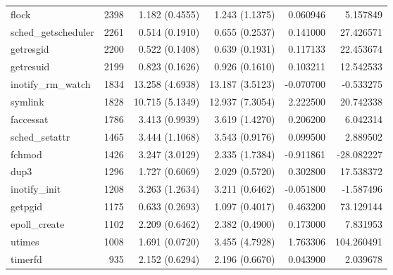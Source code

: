 \begin{longtable}{>{\ttfamily}lrrrrr}
                          flock &        2398 &           1.182 (0.4555) &           1.243 (1.1375) &        0.060946 &     5.157849 \\
            sched\_getscheduler &        2261 &           0.514 (0.1910) &           0.655 (0.2537) &        0.141000 &    27.426571 \\
                      getresgid &        2200 &           0.522 (0.1408) &           0.639 (0.1931) &        0.117133 &    22.453674 \\
                      getresuid &        2199 &           0.823 (0.1626) &           0.926 (0.1610) &        0.103211 &    12.542533 \\
             inotify\_rm\_watch &        1834 &          13.258 (4.6938) &          13.187 (3.5123) &       -0.070700 &    -0.533275 \\
                        symlink &        1828 &          10.715 (5.1349) &          12.937 (7.3054) &        2.222500 &    20.742338 \\
                      faccessat &        1786 &           3.413 (0.9939) &           3.619 (1.4270) &        0.206200 &     6.042314 \\
                 sched\_setattr &        1465 &           3.444 (1.1068) &           3.543 (0.9176) &        0.099500 &     2.889502 \\
                         fchmod &        1426 &           3.247 (3.0129) &           2.335 (1.7384) &       -0.911861 &   -28.082227 \\
                           dup3 &        1296 &           1.727 (0.6069) &           2.029 (0.5720) &        0.302800 &    17.538372 \\
                  inotify\_init &        1208 &           3.263 (1.2634) &           3.211 (0.6462) &       -0.051800 &    -1.587496 \\
                        getpgid &        1175 &           0.633 (0.2693) &           1.097 (0.4017) &        0.463200 &    73.129144 \\
                  epoll\_create &        1102 &           2.209 (0.6462) &           2.382 (0.4900) &        0.173000 &     7.831953 \\
                         utimes &        1008 &           1.691 (0.0720) &           3.455 (4.7928) &        1.763306 &   104.260491 \\
                        timerfd &         935 &           2.152 (0.6294) &           2.196 (0.6670) &        0.043900 &     2.039678 \\

\end{longtable}
